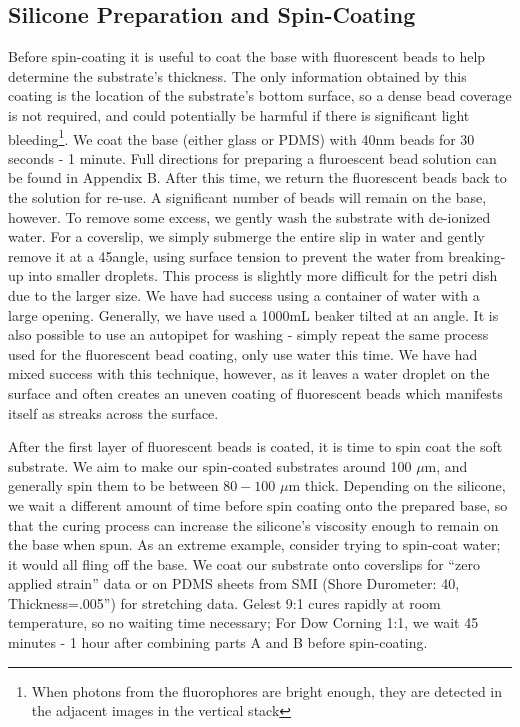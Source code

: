\subsection{Silicone Preparation and Spin-Coating}
Before spin-coating it is useful to coat the base with fluorescent beads to help determine the substrate's thickness. The only information obtained by this coating is the location of the substrate's bottom surface, so a dense bead coverage is not required, and could potentially be harmful if there is significant light bleeding\footnote{When photons from the fluorophores are bright enough, they are detected in the adjacent images in the vertical stack}. We coat the base (either glass or PDMS) with 40nm beads for 30 seconds - 1 minute. Full directions for preparing a fluroescent bead solution can be found in Appendix B. After this time, we return the fluorescent beads back to the solution for re-use. A significant number of beads will remain on the base, however. To remove some excess, we gently wash the substrate with de-ionized water. For a coverslip, we simply submerge the entire slip in water and gently remove it at a 45\degree angle, using surface tension to prevent the water from breaking-up into smaller droplets. This process is slightly more difficult for the petri dish due to the larger size. We have had success using a container of water with a large opening. Generally, we have used a 1000mL beaker tilted at an angle. It is also possible to use an autopipet for washing - simply repeat the same process used for the fluorescent bead coating, only use water this time. We have had mixed success with this technique, however, as it leaves a water droplet on the surface and often creates an uneven coating of fluorescent beads which manifests itself as streaks across the surface.

After the first layer of fluorescent beads is coated, it is time to spin coat the soft substrate. We aim to make our spin-coated substrates around 100 $\mu$m, and generally spin them to be between $80-100$ $\mu$m thick. Depending on the silicone, we wait a different amount of time before spin coating onto the prepared base, so that the curing process can increase the silicone's viscosity enough to remain on the base when spun. As an extreme example, consider trying to spin-coat water; it would all fling off the base. We coat our substrate onto coverslips for ``zero applied strain'' data or on PDMS sheets from SMI (Shore Durometer: 40, Thickness=.005'') for stretching data. Gelest 9:1 cures rapidly at room temperature, so no waiting time necessary; For Dow Corning 1:1, we wait 45 minutes - 1 hour after combining parts A and B before spin-coating.

